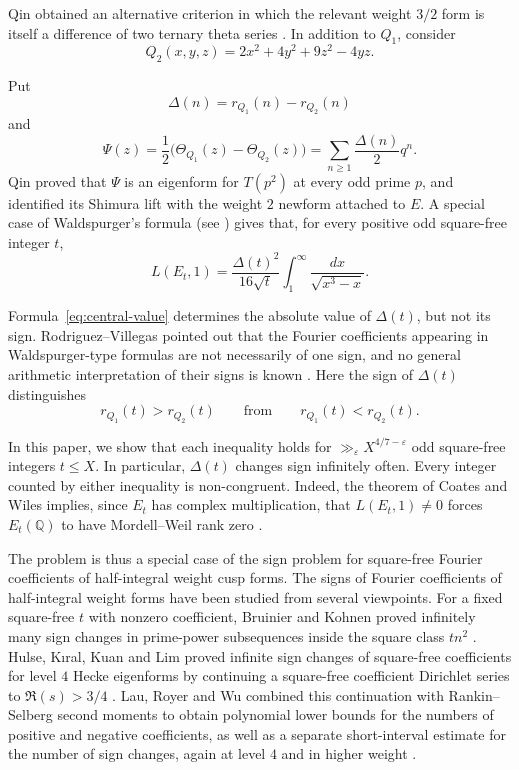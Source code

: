 \documentclass[10pt,a4paper]{amsart}
\newcommand{\Q}{\mathbb Q}
\begin{document}
Qin obtained an alternative criterion in which the relevant weight $3/2$
form is itself a difference of two ternary theta series \cite{Qin}. In
addition to $Q_1$, consider
\[
Q_2(x,y,z)=2x^2+4y^2+9z^2-4yz.
\]

Put
\[
\Delta(n)=r_{Q_1}(n)-r_{Q_2}(n)
\]
and
\[
\Psi(z)=\frac12\bigl(\Theta_{Q_1}(z)-\Theta_{Q_2}(z)\bigr)
=\sum_{n\geq1}\frac{\Delta(n)}2q^n.
\]
Qin proved that $\Psi$ is an eigenform for $T(p^2)$ at every odd prime
$p$, and identified its Shimura lift with the weight $2$ newform attached
to $E$. A special case of Waldspurger's formula (see \cite{Qin}) gives that,
for every positive odd square-free integer \(t\),
\begin{equation}\label{eq:central-value}
	L(E_t,1)=\frac{\Delta(t)^2}{16\sqrt{t}}
	\int_1^\infty\frac{dx}{\sqrt{x^3-x}}.
\end{equation}

Formula~\eqref{eq:central-value} determines the absolute value of
$\Delta(t)$, but not its sign. Rodriguez--Villegas pointed out that the Fourier coefficients appearing in Waldspurger-type formulas are not necessarily of one sign, and no general arithmetic interpretation of their signs is known \cite{RodriguezVillegas}. Here the sign of $\Delta(t)$ distinguishes
\[
r_{Q_1}(t)>r_{Q_2}(t)
\qquad\text{from}\qquad
r_{Q_1}(t)<r_{Q_2}(t).
\]

In this paper, we show that each inequality holds for $\gg_\varepsilon X^{4/7-\varepsilon}$ odd square-free integers $t\leq X$. In particular, $\Delta(t)$ changes sign infinitely often. Every integer counted by either inequality is non-congruent. Indeed, the theorem of Coates and Wiles implies, since $E_t$ has complex multiplication, that $L(E_t,1)\ne0$ forces $E_t(\Q)$ to have Mordell--Weil rank zero \cite{CoatesWiles}.

The problem is thus a special case of the sign problem for square-free
Fourier coefficients of half-integral weight cusp forms. The signs of Fourier coefficients of half-integral weight forms have
been studied from several viewpoints. For a fixed square-free $t$ with
nonzero coefficient, Bruinier and Kohnen proved infinitely many sign
changes in prime-power subsequences inside the square class $tn^2$
\cite{BruinierKohnen}. Hulse, K\i ral, Kuan and Lim proved infinite sign
changes of square-free coefficients for level $4$ Hecke eigenforms by
continuing a square-free coefficient Dirichlet series to
$\Re(s)>3/4$ \cite{HKKL}. Lau, Royer and Wu combined this continuation
with Rankin--Selberg second moments to obtain polynomial lower bounds for
the numbers of positive and negative coefficients, as well as a separate
short-interval estimate for the number of sign changes, again at level
$4$ and in higher weight \cite{LRW}.
\end{document}
